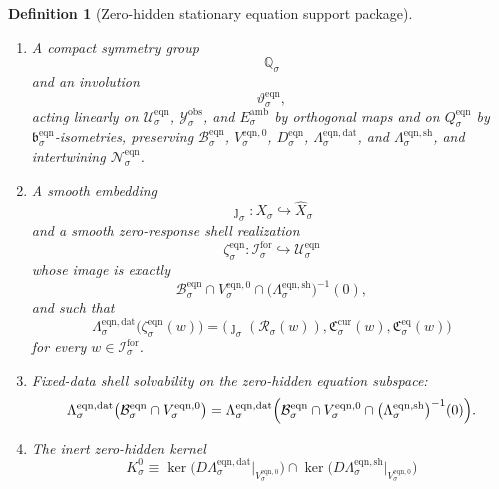 \documentclass[11pt]{article}
\newcommand{\ForSpace}[1]{\mathcal I_{#1}^{\mathrm{for}}}
\newcommand{\Reduction}[1]{\mathcal R_{#1}}
\newcommand{\CurrentCarrier}[1]{\mathfrak C_{#1}^{\mathrm{cur}}}
\newcommand{\EqCarrier}[1]{\mathfrak C_{#1}^{\mathrm{eq}}}
\newcommand{\VisibleAffine}[1]{\widehat X_{#1}}
\newcommand{\DataSpace}[1]{\mathcal Y_{#1}^{\mathrm{obs}}}
\newcommand{\AmbientTarget}[1]{E_{#1}^{\mathrm{amb}}}
\newcommand{\Kernel}[1]{K_{#1}^{0}}
\newcommand{\EqnSpace}[1]{\mathcal U_{#1}^{\mathrm{eqn}}}
\newcommand{\EqnBody}[1]{\mathcal B_{#1}^{\mathrm{eqn}}}
\newcommand{\EqnData}[1]{\Lambda_{#1}^{\mathrm{eqn,dat}}}
\newcommand{\EqnShell}[1]{\Lambda_{#1}^{\mathrm{eqn,sh}}}
\newcommand{\EqnTarget}[1]{Q_{#1}^{\mathrm{eqn}}}
\newcommand{\EqnPair}[1]{\mathfrak b_{#1}^{\mathrm{eqn}}}
\newcommand{\EqnZero}[1]{V_{#1}^{\mathrm{eqn},0}}
\newcommand{\EqnHidden}[1]{H_{#1}^{\mathrm{eqn}}}
\newcommand{\EqnHiddenBody}[1]{D_{#1}^{\mathrm{eqn}}}
\newcommand{\EqnLin}[1]{\mathcal N_{#1}^{\mathrm{eqn}}}
\newcommand{\EqnSym}[1]{\mathbb Q_{#1}}
\newcommand{\EqnTime}[1]{\vartheta_{#1}^{\mathrm{eqn}}}
\newcommand{\EqnEmbed}[1]{\zeta_{#1}^{\mathrm{eqn}}}
\newtheorem{definition}{Definition}
\begin{document}
\begin{definition}[Zero-hidden stationary equation support package]
\begin{enumerate}
\begin{equation}
    \qquad
    \text{for all }\delta z\in\EqnZero{\sigma},
    \label{eq:supportzero}
    \end{equation}
    and such that there exists \(\lambda_{\sigma}^{\mathrm{eqn}}>0\) with
    \begin{equation}
    \EqnPair{\sigma}\bigl(\EqnLin{\sigma}\eta,\EqnLin{\sigma}\eta\bigr)
    \ge
    \lambda_{\sigma}^{\mathrm{eqn}}\,
    \|\eta\|^{2}
    \qquad
    \text{for all }\eta\in\EqnHidden{\sigma}.
    \label{eq:supportgap}
    \end{equation}
    \item A compact symmetry group
    \[
    \EqnSym{\sigma}
    \]
    and an involution
    \[
    \EqnTime{\sigma},
    \]
    acting linearly on \(\EqnSpace{\sigma}\), \(\DataSpace{\sigma}\), and \(\AmbientTarget{\sigma}\) by orthogonal maps and on \(\EqnTarget{\sigma}\) by \(\EqnPair{\sigma}\)-isometries, preserving \(\EqnBody{\sigma}\), \(\EqnZero{\sigma}\), \(\EqnHiddenBody{\sigma}\), \(\EqnData{\sigma}\), and \(\EqnShell{\sigma}\), and intertwining \(\EqnLin{\sigma}\).
    \item A smooth embedding
    \[
    \jmath_{\sigma}:X_{\sigma}\hookrightarrow\VisibleAffine{\sigma}
    \]
    and a smooth zero-response shell realization
    \[
    \EqnEmbed{\sigma}:\ForSpace{\sigma}\hookrightarrow\EqnSpace{\sigma}
    \]
    whose image is exactly
    \[
    \EqnBody{\sigma}\cap
    \EqnZero{\sigma}\cap
    \bigl(\EqnShell{\sigma}\bigr)^{-1}(0),
    \]
    and such that
    \begin{equation}
    \EqnData{\sigma}\bigl(\EqnEmbed{\sigma}(w)\bigr)
    =
    \bigl(
    \jmath_{\sigma}(\Reduction{\sigma}(w)),
    \CurrentCarrier{\sigma}(w),
    \EqCarrier{\sigma}(w)
    \bigr)
    \label{eq:supportcompat}
    \end{equation}
    for every \(w\in\ForSpace{\sigma}\).
    \item Fixed-data shell solvability on the zero-hidden equation subspace:
    \begin{equation}
    \EqnData{\sigma}\bigl(
    \EqnBody{\sigma}\cap\EqnZero{\sigma}
    \bigr)
    =
    \EqnData{\sigma}\Bigl(
    \EqnBody{\sigma}\cap
    \EqnZero{\sigma}\cap
    \bigl(\EqnShell{\sigma}\bigr)^{-1}(0)
    \Bigr).
    \label{eq:supportsolvability}
    \end{equation}
    \item The inert zero-hidden kernel
    \[
    \Kernel{\sigma}
    \equiv
    \ker\bigl(D\EqnData{\sigma}\big|_{\EqnZero{\sigma}}\bigr)
    \cap
    \ker\bigl(D\EqnShell{\sigma}\big|_{\EqnZero{\sigma}}\bigr)
\]
\end{enumerate}
\end{definition}
\end{document}
